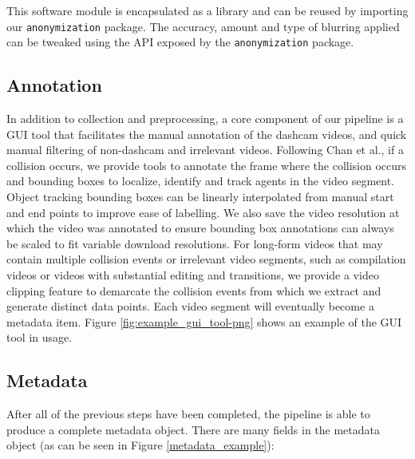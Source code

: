 \documentclass[letterpaper, 10 pt, conference]{ieeeconf}
\begin{document}
This software module is encapsulated as a library and can be reused by importing our \texttt{anonymization} package. The accuracy, amount and type of blurring applied can be tweaked using the API exposed by the \texttt{anonymization} package.

\subsection{Annotation}

In addition to collection and preprocessing, a core component of our pipeline is a GUI tool that facilitates the manual annotation of the dashcam videos, and quick manual filtering of non-dashcam and irrelevant videos. Following Chan et al.\cite{chan2016anticipating}, if a collision occurs, we provide tools to annotate the frame where the collision occurs and bounding boxes to localize, identify and track agents in the video segment. Object tracking bounding boxes can be linearly interpolated from manual start and end points to improve ease of labelling. We also save the video resolution at which the video was annotated to ensure bounding box annotations can always be scaled to fit variable download resolutions. For long-form videos that may contain multiple collision events or irrelevant video segments, such as compilation videos or videos with substantial editing and transitions, we provide a video clipping feature to demarcate the collision events from which we extract and generate distinct data points. 
Each video segment will eventually become a metadata item. Figure \ref{fig:example_gui_tool-png} shows an example of the GUI tool in usage.

\subsection{Metadata}
After all of the previous steps have been completed, the pipeline is able to produce a complete metadata object.
There are many fields in the metadata object (as can be seen in Figure \ref{metadata_example}):
\end{document}

